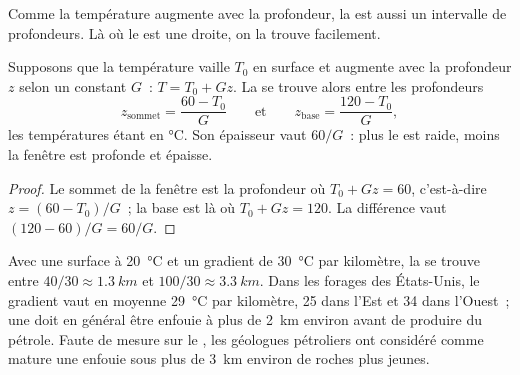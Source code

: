 Comme la température augmente avec la profondeur, la  est
aussi un intervalle de profondeurs. Là où le  est une droite, on
la trouve facilement.

\begin{proposition}\label{prop:g11:fossil-fuel-geology:window-depth}
Supposons que la température vaille $T_0$ en surface et augmente avec la
profondeur $z$ selon un  constant $G$~:
$T = T_0 + G z$. La  se trouve alors entre les profondeurs
\[
  z_{\text{sommet}} = \frac{60 - T_0}{G}
  \qquad\text{et}\qquad
  z_{\text{base}} = \frac{120 - T_0}{G},
\]
les températures étant en \unit{\degreeCelsius}. Son épaisseur vaut
$60/G$~: plus le  est raide, moins la fenêtre est profonde et
épaisse.
\end{proposition}

\begin{proof}
Le sommet de la fenêtre est la profondeur où $T_0 + G z = 60$,
c'est-à-dire $z = (60 - T_0)/G$~; la base est là où $T_0 + G z = 120$.
La différence vaut $(120 - 60)/G = 60/G$.
\end{proof}

Avec une surface à \qty{20}{\degreeCelsius} et un gradient de
\qty{30}{\degreeCelsius} par kilomètre, la  se trouve entre
$40/30 \approx \qty{1.3}{km}$ et $100/30 \approx \qty{3.3}{km}$. Dans les
forages des États-Unis, le gradient vaut en moyenne
\qty{29}{\degreeCelsius} par kilomètre, \num{25} dans l'Est et \num{34}
dans l'Ouest~; une  doit en général être enfouie à plus de
\qty{2}{km} environ avant de produire du pétrole. Faute de mesure sur le
, les géologues pétroliers ont considéré comme mature une  enfouie sous plus de \qty{3}{km} environ de roches plus jeunes.

